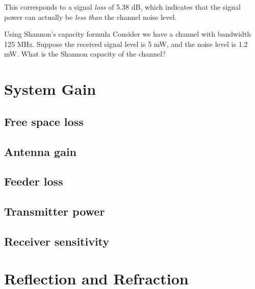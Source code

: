 This corresponds to a signal \textit{loss} of 5.38 dB, which indicates
that the signal power can actually be \textit{less than} the channel
noise level.

\begin{exercise}{Using Shannon's capacity formula}
Consider we have a channel with bandwidth 125 MHz. Suppose the received
signal level is 5 mW, and the noise level is 1.2 mW. What is the Shannon capacity of
the channel?
\end{exercise}


\section{System Gain}

\subsection{Free space loss}

\subsection{Antenna gain}

\subsection{Feeder loss}

\subsection{Transmitter power}

\subsection{Receiver sensitivity}


\section{Reflection and Refraction}

